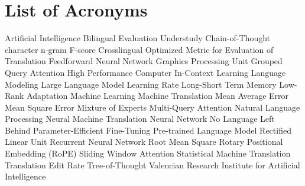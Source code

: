 \documentclass[11pt,english,listoffigures,listoftables]{tfgetsinf}
\begin{document}
\begin{abstract}[english]
Machine Translation (MT) is an important field within machine learning, where the development of large language models has shown great potential to improve current translation systems. Thanks to the pre-trained models provided by large technology companies such as Meta, Mistral AI or Google, multilingual machine translation has experienced a remarkable improvement in recent years. In this context, this work will evaluate the performance of the main large language models adapted to specific translation tasks in different language pairs. To this end, we will make use of data, technology, and expertise from the MLLP group of VRAIN, acquired within the framework of research and technology transfer projects developed in recent years.
\end{abstract}

\clearpage


{\let\cleardoublepage\relax \chapter{List of Acronyms}}

\begin{acronym}
     Artificial Intelligence 
     Bilingual Evaluation Understudy
     Chain-of-Thought
     character n-gram F-score
     Crosslingual Optimized Metric for Evaluation of Translation
     Feedforward Neural Network
     Graphics Processing Unit
     Grouped Query Attention
     High Performance Computer
     In-Context Learning
     Language Modeling
     Large Language Model
     Learning Rate
     Long-Short Term Memory
     Low-Rank Adaptation
     Machine Learning 
     Machine Translation
     Mean Average Error
     Mean Square Error
     Mixture of Experts
     Multi-Query Attention
     Natural Language Processing
     Neural Machine Translation
     Neural Network
     No Language Left Behind
     Parameter-Efficient Fine-Tuning
     Pre-trained Language Model
     Rectified Linear Unit
     Recurrent Neural Network
     Root Mean Square
     Rotary Positional Embedding (RoPE)
     Sliding Window Attention
     Statistical Machine Translation
     Translation Edit Rate
     Tree-of-Thought
     Valencian Research Institute for Artificial Intelligence
\end{acronym}
\end{document}
